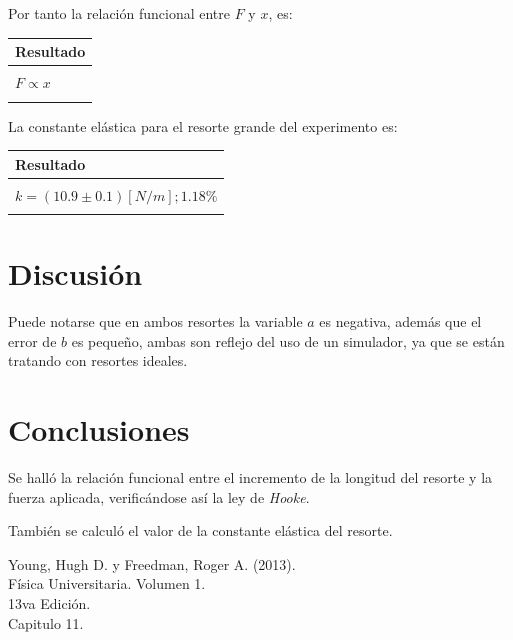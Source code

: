 \documentclass[letter,11pt]{article}
\begin{document}
Por tanto la relación funcional entre $F$ y $x$, es:

\begin{center}
\begin{tabular}{|>{\centering}m{9.2cm}<{\centering}|}
\hline
\textbf{Resultado} 
\tabularnewline \hline
\\
$F \propto x$ \tabularnewline
\\
\hline
\end{tabular}
\end{center}
\vspace{0.10cm}

La constante elástica para el resorte grande del experimento es:

\begin{center}
\begin{tabular}{|>{\centering}m{9.2cm}<{\centering}|}
\hline
\textbf{Resultado} 
\tabularnewline \hline
\\
$k = (10.9 \pm 0.1) [N/m]; 1.18\%$ \tabularnewline
\\
\hline
\end{tabular}
\end{center}
\vspace{0.10cm}

\section{Discusión}

Puede notarse que en ambos resortes la variable $a$ es negativa, además que
el error de $b$ es pequeño, ambas son reflejo del uso de un simulador, ya que se
están tratando con resortes ideales.

\section{Conclusiones}

Se halló la relación funcional entre el incremento de la longitud del resorte y
la fuerza aplicada, verificándose así la ley de \emph{Hooke}.

También se calculó el valor de la constante elástica del resorte.

\begin{thebibliography}{99}

 Young, Hugh D. y Freedman, Roger A. (2013).\\
Física Universitaria. Volumen 1.\\
13va Edición.\\
Capitulo 11.

\end{thebibliography}
\end{document}
